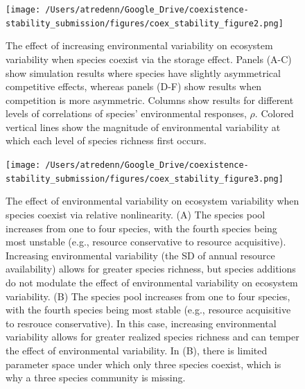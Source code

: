 \documentclass[12pt,]{article}
\begin{document}
\newpage{}

\begin{figure}[!ht]
  \centering
      \texttt{[image: /Users/atredenn/Google\_Drive/coexistence-stability\_submission/figures/coex\_stability\_figure2.png]}
  \caption{The effect of increasing environmental variability on ecosystem variability when species coexist via the storage effect. Panels (A-C) show simulation results where species have slightly asymmetrical competitive effects, whereas panels (D-F) show results when competition is more asymmetric. Columns show results for different levels of correlations of species' environmental responses, $\rho$. Colored vertical lines show the magnitude of environmental variability at which each level of species richness first occurs.}
\end{figure}

\newpage{}

\begin{figure}[!ht]
  \centering
      \texttt{[image: /Users/atredenn/Google\_Drive/coexistence-stability\_submission/figures/coex\_stability\_figure3.png]}
  \caption{The effect of environmental variability on ecosystem variability when species coexist via relative nonlinearity. (A) The species pool increases from one to four species, with the fourth species being most unstable (e.g., resource conservative to resource acquisitive). Increasing environmental variability (the SD of annual resource availability) allows for greater species richness, but species additions do not modulate the effect of environmental variability on ecosystem variability. (B) The species pool increases from one to four species, with the fourth species being most stable (e.g., resource acquisitive to resrouce conservative). In this case, increasing environmental variability allows for greater realized species richness and can temper the effect of environmental variability. In (B), there is limited parameter space under which only three species coexist, which is why a three species community is missing.}
\end{figure}

\newpage{}
\end{document}
